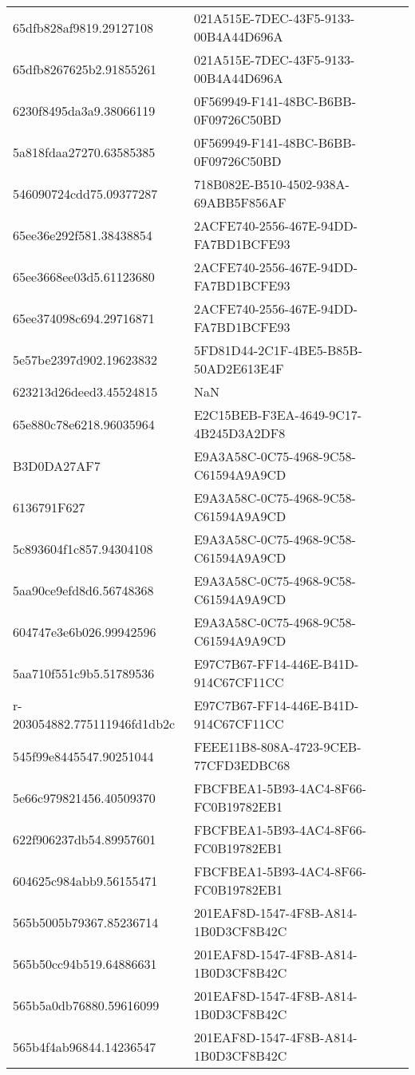 \begin{tabular}{ll}
65dfb828af9819.29127108 & 021A515E-7DEC-43F5-9133-00B4A44D696A \\
65dfb8267625b2.91855261 & 021A515E-7DEC-43F5-9133-00B4A44D696A \\
6230f8495da3a9.38066119 & 0F569949-F141-48BC-B6BB-0F09726C50BD \\
5a818fdaa27270.63585385 & 0F569949-F141-48BC-B6BB-0F09726C50BD \\
546090724cdd75.09377287 & 718B082E-B510-4502-938A-69ABB5F856AF \\
65ee36e292f581.38438854 & 2ACFE740-2556-467E-94DD-FA7BD1BCFE93 \\
65ee3668ee03d5.61123680 & 2ACFE740-2556-467E-94DD-FA7BD1BCFE93 \\
65ee374098c694.29716871 & 2ACFE740-2556-467E-94DD-FA7BD1BCFE93 \\
5e57be2397d902.19623832 & 5FD81D44-2C1F-4BE5-B85B-50AD2E613E4F \\
623213d26deed3.45524815 & NaN \\
65e880c78e6218.96035964 & E2C15BEB-F3EA-4649-9C17-4B245D3A2DF8 \\
B3D0DA27AF7 & E9A3A58C-0C75-4968-9C58-C61594A9A9CD \\
6136791F627 & E9A3A58C-0C75-4968-9C58-C61594A9A9CD \\
5c893604f1c857.94304108 & E9A3A58C-0C75-4968-9C58-C61594A9A9CD \\
5aa90ce9efd8d6.56748368 & E9A3A58C-0C75-4968-9C58-C61594A9A9CD \\
604747e3e6b026.99942596 & E9A3A58C-0C75-4968-9C58-C61594A9A9CD \\
5aa710f551c9b5.51789536 & E97C7B67-FF14-446E-B41D-914C67CF11CC \\
r-203054882.775111946fd1db2c & E97C7B67-FF14-446E-B41D-914C67CF11CC \\
545f99e8445547.90251044 & FEEE11B8-808A-4723-9CEB-77CFD3EDBC68 \\
5e66c979821456.40509370 & FBCFBEA1-5B93-4AC4-8F66-FC0B19782EB1 \\
622f906237db54.89957601 & FBCFBEA1-5B93-4AC4-8F66-FC0B19782EB1 \\
604625c984abb9.56155471 & FBCFBEA1-5B93-4AC4-8F66-FC0B19782EB1 \\
565b5005b79367.85236714 & 201EAF8D-1547-4F8B-A814-1B0D3CF8B42C \\
565b50cc94b519.64886631 & 201EAF8D-1547-4F8B-A814-1B0D3CF8B42C \\
565b5a0db76880.59616099 & 201EAF8D-1547-4F8B-A814-1B0D3CF8B42C \\
565b4f4ab96844.14236547 & 201EAF8D-1547-4F8B-A814-1B0D3CF8B42C \\

\end{tabular}
